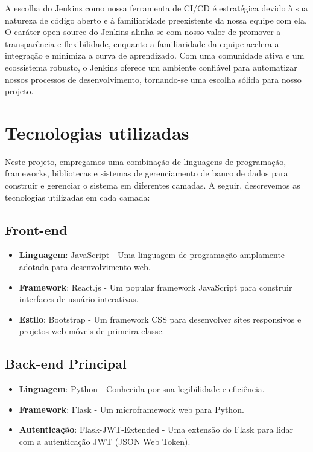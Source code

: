 A escolha do Jenkins como nossa ferramenta de CI/CD é estratégica devido à sua natureza de código aberto e à familiaridade preexistente da nossa equipe com ela. O caráter open source do Jenkins alinha-se com nosso valor de promover a transparência e flexibilidade, enquanto a familiaridade da equipe acelera a integração e minimiza a curva de aprendizado. Com uma comunidade ativa e um ecossistema robusto, o Jenkins oferece um ambiente confiável para automatizar nossos processos de desenvolvimento, tornando-se uma escolha sólida para nosso projeto.

\section{Tecnologias utilizadas}

Neste projeto, empregamos uma combinação de linguagens de programação, frameworks, bibliotecas e sistemas de gerenciamento de banco de dados para construir e gerenciar o sistema em diferentes camadas. A seguir, descrevemos as tecnologias utilizadas em cada camada:

\subsection{Front-end}
\begin{itemize}
	\item \textbf{Linguagem}: JavaScript - Uma linguagem de programação amplamente adotada para desenvolvimento web.
	\item \textbf{Framework}: React.js - Um popular framework JavaScript para construir interfaces de usuário interativas.
	\item \textbf{Estilo}: Bootstrap - Um framework CSS para desenvolver sites responsivos e projetos web móveis de primeira classe.
\end{itemize}

\subsection{Back-end Principal}
\begin{itemize}
	\item \textbf{Linguagem}: Python - Conhecida por sua legibilidade e eficiência.
	\item \textbf{Framework}: Flask - Um microframework web para Python.
	\item \textbf{Autenticação}: Flask-JWT-Extended - Uma extensão do Flask para lidar com a autenticação JWT (JSON Web Token).
\end{itemize}

